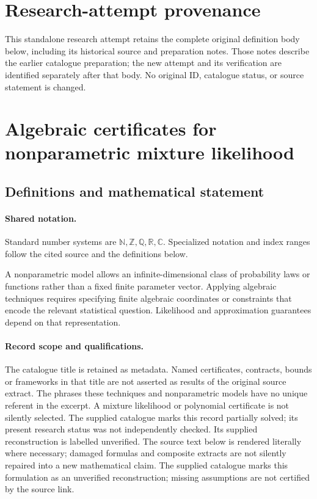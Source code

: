 \documentclass[11pt]{article}
\begin{document}
\section*{Research-attempt provenance}
This standalone research attempt retains the complete original definition body below,
including its historical source and preparation notes. Those notes describe the
earlier catalogue preparation; the new attempt and its verification are identified
separately after that body. No original ID, catalogue status, or source statement is changed.

\section{Algebraic certificates for nonparametric mixture likelihood}\label{statement}

\subsection{Definitions and mathematical statement}

\paragraph{Shared notation.}Standard number systems are $\mathbb N,\mathbb Z,\mathbb Q,\mathbb R,\mathbb C$. Specialized notation and index ranges follow the cited source and the definitions below.


A nonparametric model allows an infinite-dimensional class of probability laws or functions rather than a fixed finite parameter vector. Applying algebraic techniques requires specifying finite algebraic coordinates or constraints that encode the relevant statistical question. Likelihood and approximation guarantees depend on that representation.
\paragraph{Record scope and qualifications.}
The catalogue title is retained as metadata. Named certificates, contracts, bounds or frameworks in that title are not asserted as results of the original source extract.
The phrases these techniques and nonparametric models have no unique referent in the excerpt. A mixture likelihood or polynomial certificate is not silently selected. The supplied catalogue marks this record partially solved; its present research status was not independently checked. Its supplied reconstruction is labelled unverified.
The source text below is rendered literally where necessary; damaged formulas and composite extracts are not silently repaired into a new mathematical claim.
The supplied catalogue marks this formulation as an unverified reconstruction; missing assumptions are not certified by the source link.
\end{document}
